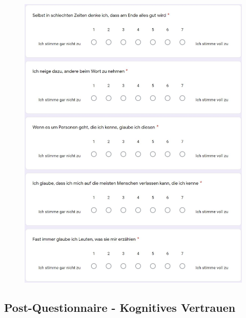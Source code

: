 \documentclass[a4paper,11pt]{article}%
\renewcommand{\\}{\vspace*{0.5\baselineskip} \newline}
\begin{document}
	\begin{figure}[H]
	\centering
		\begin{footnotesize}
			\includegraphics[scale=0.6]{Abbildungen/Fragebogen/Post-Questionnaire/PQG4}
		\end{footnotesize}
	\end{figure}	

\newpage
\subsection{Post-Questionnaire - Kognitives Vertrauen}	
\label{Post-Questionnaire - Kognitives Vertrauen}	
\end{document}

